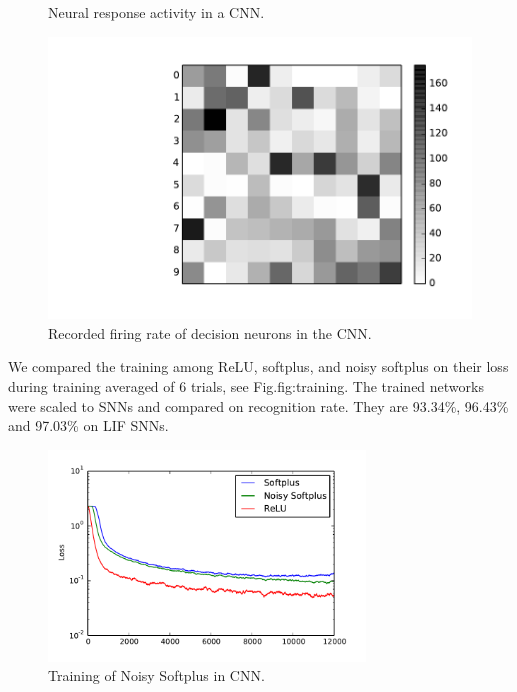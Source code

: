 \documentclass[runningheads,a4paper]{llncs}
\begin{document}
\begin{figure}[bt!]
	\caption{
	Neural response activity in a CNN.}
	\label{fig:cnn}
\end{figure}

\begin{figure}[bt!]
	\centering
	\includegraphics[height=0.3\textwidth]{pic/7.pdf}
	\caption{
	Recorded firing rate of decision neurons in the CNN.}
	\label{fig:result}	
\end{figure}


We compared the training among ReLU, softplus, and noisy softplus on their loss during training averaged of 6 trials, see Fig.{fig:training}.
The trained networks were scaled to SNNs and compared on recognition rate.
They are 93.34\%, 96.43\% and 97.03\% on LIF SNNs.
\begin{figure}[bt!]
	\centering
	\includegraphics[width=0.75\textwidth]{pic/8.pdf}
	\caption{
	Training of Noisy Softplus in CNN.}
	\label{fig:training}	
\end{figure}
\end{document}
